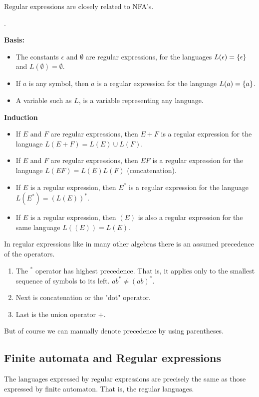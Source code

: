Regular expressions are closely related to NFA's. 

\begin{definition}. \label{def:re}

    \textbf{Basis:} 
    \begin{itemize}
        \item The constants $\epsilon$ and $\emptyset$ are regular expressions, for the languages $L(\epsilon) = \left\{ \epsilon \right\}$ and $L(\emptyset) = \emptyset$.
        \item If $a$ is any symbol, then $a$ is a regular expression for the language $L(a) = \left\{ a \right\}$.
        \item A variable such as $L$, is a variable representing any language. 
    \end{itemize}
    \textbf{Induction}
    \begin{itemize}
        \item If $E$ and $F$ are regular expressions, then $E + F$ is a regular expression for the language $L(E + F) = L(E) \cup L(F)$.
        \item If $E$ and $F$ are regular expressions, then $EF$ is a regular expression for the language $L(EF) = L(E)L(F)$ (concatenation). 
        \item If $E$ is a regular expression, then $E^*$ is a regular expression for the language $L(E^*) = (L(E))^*$.
        \item If $E$ is a regular expression, then $(E)$ is also a regular expression for the same language $L((E)) = L(E)$.
    \end{itemize}
\end{definition}

In regular expressions like in many other algebras there is an assumed precedence of the operators. 

\begin{enumerate}
    \item The $^*$ operator has highest precedence. That is, it applies only to the smallest sequence of symbols to its left. $ab^* \neq (ab)^*$.
    \item Next is concatenation or the "dot" operator. 
    \item Last is the union operator $+$. 
\end{enumerate}

But of course we can manually denote precedence by using parentheses. 

\subsection{Finite automata and Regular expressions}
The languages expressed by regular expressions are precisely the same as those expressed by finite automaton. That is, the regular languages. 

